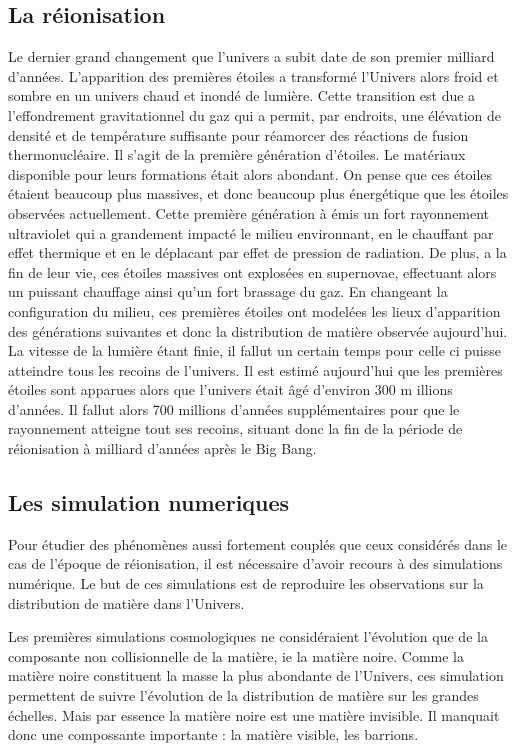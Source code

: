 \subsection*{La réionisation}
Le dernier grand changement que l'univers a subit date de son premier milliard d'années.
L'apparition des premières étoiles a transformé l'Univers alors froid et sombre en un univers chaud et inondé de lumière.
Cette transition est due a l'effondrement gravitationnel du gaz qui a permit, par endroits, une élévation de densité et de température suffisante pour réamorcer des réactions de fusion thermonucléaire.
Il s'agit de la première génération d'étoiles.
Le matériaux disponible pour leurs formations était alors abondant.
On pense que ces étoiles étaient beaucoup plus massives, et donc beaucoup plus énergétique que les étoiles observées actuellement.
Cette première génération à émis un fort rayonnement ultraviolet qui a grandement impacté le milieu environnant, en le chauffant par effet thermique et en le déplacant par effet de pression de radiation.
De plus, a la fin de leur vie, ces étoiles massives ont explosées en supernovae, effectuant alors un puissant chauffage ainsi qu'un fort brassage du gaz.
En changeant la configuration du milieu, ces premières étoiles ont modelées les lieux d'apparition des générations suivantes et donc la distribution de matière observée aujourd'hui.
La vitesse de la lumière étant finie, il fallut un certain temps pour celle ci puisse atteindre tous les recoins de l'univers. Il est estimé aujourd'hui que les premières étoiles sont apparues alors que l'univers était âgé d'environ 300 m
illions d'années. Il fallut alors 700 millions d'années supplémentaires pour que le rayonnement atteigne tout ses recoins, situant donc la fin de la période de  réionisation à milliard d'années après le Big Bang.

\subsection*{Les simulation numeriques}
Pour étudier des phénomènes aussi fortement couplés que ceux considérés dans le cas de l'époque de réionisation, il est nécessaire d'avoir recours à des simulations numérique. 
Le but de ces simulations est de reproduire les observations sur la distribution de matière dans l'Univers.

Les premières simulations cosmologiques ne considéraient l'évolution que de la composante non collisionnelle de la matière, ie la matière noire.
Comme la matière noire constituent la masse la plus abondante de l'Univers, ces simulation permettent de suivre l'évolution de la distribution de matière sur les grandes échelles. 
Mais par essence la matière noire est une matière invisible. 
Il manquait donc une compossante importante : la matière visible, les barrions.

